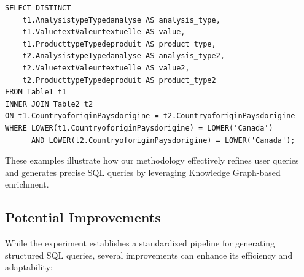 \begin{verbatim}
SELECT DISTINCT 
    t1.AnalysistypeTypedanalyse AS analysis_type, 
    t1.ValuetextValeurtextuelle AS value, 
    t1.ProducttypeTypedeproduit AS product_type, 
    t2.AnalysistypeTypedanalyse AS analysis_type2, 
    t2.ValuetextValeurtextuelle AS value2, 
    t2.ProducttypeTypedeproduit AS product_type2
FROM Table1 t1
INNER JOIN Table2 t2 
ON t1.CountryoforiginPaysdorigine = t2.CountryoforiginPaysdorigine
WHERE LOWER(t1.CountryoforiginPaysdorigine) = LOWER('Canada') 
      AND LOWER(t2.CountryoforiginPaysdorigine) = LOWER('Canada');
\end{verbatim}

These examples illustrate how our methodology effectively refines user queries and generates precise SQL queries by leveraging Knowledge Graph-based enrichment.


\subsection{Potential Improvements}

While the experiment establishes a standardized pipeline for generating structured SQL queries, several improvements can enhance its efficiency and adaptability:  

